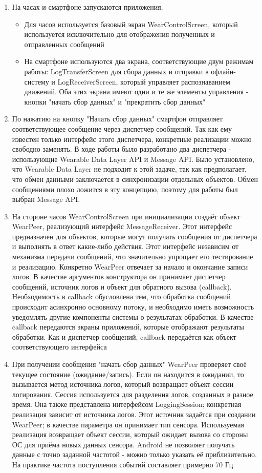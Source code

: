 \begin{enumerate}
\item На часах и смартфоне запускаются приложения.
  \begin{itemize}
  \item  Для часов используется базовый экран WearControlScreen, который используется исключительно для отображения полученных и отправленных сообщений
  \item На смартфоне используются два экрана, соответствующие двум режимам работы: LogTransferScreen для сбора данных и отправки в офлайн-систему и LogReceiverScreen, который управляет распознаванием движений. Оба этих экрана имеют одни и те же элементы управления - кнопки "начать сбор данных" и "прекратить сбор данных"
  \end{itemize}
\item По нажатию на кнопку "Начать сбор данных" смартфон отправляет соответствующее сообщение через диспетчер сообщений. Так как ему известен только интерфейс этого диспетчера, конкретные реализации можно свободно заменять. В ходе работы было разработано два диспетчера - использующие Wearable Data Layer API и Message API. Было установлено, что Wearable Data Layer не подходит к этой задаче, так как предполагает, что обмен данными заключается в синхронизации отдельных объектов. Обмен сообщениями плохо ложится в эту концепцию, поэтому для работы был выбран Message API.
\item На стороне часов WearControlScreen при инициализации создаёт объект WearPeer, реализующий интерфейс MessageReceiver. Этот интерфейс предназначен для объектов, которые могут получать сообщения от диспетчера и выполнять в ответ какие-либо действия. Этот интерфейс независим от механизма передачи сообщений, что значительно упрощает его тестирование и реализацию. Конкретно WearPeer отвечает за начало и окончание записи логов. В качестве аргументов конструктора он принимает диспетчер сообщений, источник логов и объект для обратного вызова (callback). Необходимость в callback обусловлена тем, что обработка сообщений происходит асинхронно основному потоку, и необходимо иметь возможность уведомлять другие компоненты системы о результатах обработки. В качестве callback передаются экраны приложений, которые отображают результаты обработки. Как и диспетчер сообщений, callback передаётся как объект соответствующего интерфейса
\item При получении сообщения "начать сбор данных" WearPeer проверяет своё текущее состояние (ожидание/запись). Если он находится в ожидании, то вызывается метод источника логов, который возвращает объект сессии логирования. Сессия используется для разделения логов, созданных в разное время. Она также представлена интерфейсом LoggingSession; конкретная реализация зависит от источника логов. Этот источник задаётся при создании WearPeer; в качестве параметра он принимает тип сенсора. Используемая реализация возвращает объект сессии, который ожидает вызова со стороны ОС для приёма новых данных сенсора. Android не позволяет получать данные с точно заданной частотой - можно только указать её приблизительно. На практике частота поступления событий составляет примерно 70 Гц

\end{enumerate}
